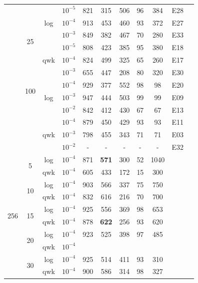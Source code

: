 \documentclass{IOS-Book-Article}
\begin{document}
\begin{table}[h!]
\begin{tabular}{c|c|c|c|c|c|c|c|c|c|c}
		\cline{2-10}
		& \multirow{6}{*}{25} & \multirow{3}{*}{log} & $10^{-5}$ & 821 & 315 & 506 & 96 & 384 & E28\\
		& & & $10^{-4}$ & 913 & 453 & 460 & 93 & 372 & E27\\
		& & & $10^{-3}$ & 849 & 382 & 467 & 70 & 280 & E33\\\cline{3-10}
		& & \multirow{3}{*}{qwk} & $10^{-5}$ & 808 & 423 & 385 & 95 & 380 & E18\\
		& & & $10^{-4}$ & 824 & 499 & 325 & 65 & 260 & E17\\
		& & & $10^{-3}$ & 655 & 447 & 208 & 80 & 320 & E30\\
		\cline{2-10}
		& \multirow{2}{*}{100} & \multirow{3}{*}{log} & $10^{-4}$ & 929 & 377 & 552 & 98 & 98 & E20\\
		& & & $10^{-3}$ & 947 & 444 & 503 & 99 & 99 & E09\\
		& & & $10^{-2}$ & 842 & 412 & 430 & 67 & 67 & E13\\\cline{3-10}
		& & \multirow{3}{*}{qwk} & $10^{-4}$ & 879 & 450 & 429 & 93 & 93 & E11\\
		& & & $10^{-3}$ & 798 & 455 & 343 & 71 & 71 & E03\\
		& & & $10^{-2}$ & - & - & - & - & - & E32\\
		\hline	
		\multirow{10}{*}{256} & \multirow{2}{*}{5} & \multirow{1}{*}{log} & $10^{-4}$ & 871 & \textbf{571} & 300 & 52 & 1040 & \\\cline{3-10}
		& & \multirow{1}{*}{qwk} & $10^{-4}$ & 605 & 433 & 172 & 15 & 300 & \\
		\cline{2-10}
		&\multirow{2}{*}{10} & \multirow{1}{*}{log} & $10^{-4}$ & 903 & 566  & 337 & 75 & 750 & \\\cline{3-10}
		& & \multirow{1}{*}{qwk} & $10^{-4}$ & 832 & 616 & 216 & 70 & 700 & \\
		\cline{2-10}		
		& \multirow{2}{*}{15} & \multirow{1}{*}{log} & $10^{-4}$ & 925 & 556 & 369 & 98 & 653 & \\\cline{3-10}
		& & \multirow{1}{*}{qwk} & $10^{-4}$ & 878 & \textbf{622} & 256 & 93 & 620 & \\
		\cline{2-10}
		& \multirow{2}{*}{20} & \multirow{1}{*}{log} & $10^{-4}$ & 923 & 525 & 398 & 97 & 485 & \\\cline{3-10}
		& & \multirow{1}{*}{qwk} & $10^{-4}$ &  & \textbf{} &  &  &  & \\
		\cline{2-10}		
		& \multirow{2}{*}{30} & \multirow{1}{*}{log} & $10^{-4}$ & 925 & 514 & 411 & 93 & 310 & \\\cline{3-10}
		& & \multirow{1}{*}{qwk} & $10^{-4}$ & 900 & 586 & 314 & 98 & 327 & \\

\end{tabular}
\end{table}
\end{document}
